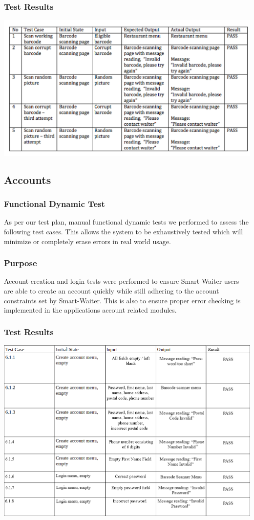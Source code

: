 \documentclass[12pt, titlepage]{article}
\begin{document}
\subsubsection{Test Results}
\includegraphics[width=1.2\textwidth]{barcodeTable.png}

\subsection{Accounts}
\subsubsection{Functional Dynamic Test}
As per our test plan, manual functional dynamic tests we performed to assess the following test cases. This allows the system to be exhaustively tested which will minimize or completely erase errors in real world usage.
\subsubsection{Purpose}
Account creation and login tests were performed to ensure Smart-Waiter users are able to create an account quickly while still adhering to the account constraints set by Smart-Waiter. This is also to ensure proper error checking is implemented in the applications account related modules.

\subsubsection{Test Results}
\includegraphics[width=1.2\textwidth]{accountTC.png}
\end{document}
